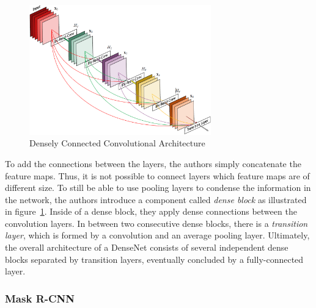 \begin{figure}[h]
    \centering
    \includegraphics[width=0.7\textwidth]{images/dense-net-architecture}
    \caption{Densely Connected Convolutional Architecture~\cite{densenet18}}
    \label{fig:densenet_architecture}
\end{figure}

To add the connections between the layers, the authors simply concatenate the feature maps. Thus, it is not possible to connect layers which feature maps are of different size. To still be able to use pooling layers to condense the information in the network, the authors introduce a component called \emph{dense block} as illustrated in figure~\ref{fig:densenet_architecture}. Inside of a dense block, they apply dense connections between the convolution layers. In between two consecutive dense blocks, there is a \emph{transition layer}, which is formed by a convolution and an average pooling layer. Ultimately, the overall architecture of a DenseNet consists of several independent dense blocks separated by transition layers, eventually concluded by a fully-connected layer.

\subsubsection{Mask R-CNN}
\label{sec:mask-rcnn}

